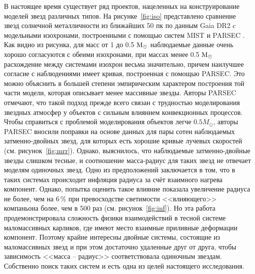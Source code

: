 В настоящее время существует ряд проектов, нацеленных на конструирование моделей звезд различных типов. На рисунке~\ref{fig:iso} представлено сравнение звезд солнечной металличности из ближайших 50 пк по данным Gaia DR2 c модельными изохронами, построенными с помощью систем MIST \cite{2016ApJ...823..102C} и PARSEC \cite{2012MNRAS.427..127B}. Как видно из рисунка, для масс от 1 до 0.5 \(\textup{M}_\odot\) наблюдаемые данные очень хорошо согласуются с обеими изохронами, при массах менее 0.5 \(\textup{M}_\odot\) расхождение между системами изохрон весьма значительно, причем наилучшее согласие с наблюдениями имеет кривая, построенная с помощью PARSEC. Это можно объяснить в большей степени эмпирическим характером построения той части модели, которая описывает менее массивные звезды. Авторы PARSEC отмечают, что такой подход прежде всего связан с трудностью моделирования звездных атмосфер у объектов с сильным влиянием конвекционных процессов. Чтобы справиться с проблемой моделирования объектов легче $0.5 M_\odot$, авторы PARSEC вносили поправки на основе данных для пары сотен наблюдаемых затменно-двойных звезд, для которых есть хорошие кривые лучевых скоростей (см. рисунок~\ref{fig:mrr}). Однако, выяснилось, что наблюдаемые затменно-двойные звезды слишком тесные, и соотношение масса-радиус для таких звезд не отвечает моделям одиночных звезд. Одно из предположений заключается в том, что в таких системах происходит инфляция радиуса за счёт взаимного нагрева компонент. Однако, попытка оценить такое влияние показала увеличение радиуса не более, чем на 6\,\%  при превосходстве светимости <<влияющего>> компаньона более, чем в 500 раз (см. рисунок~\ref{fig:inf}). Но эта работа продемонстрировала сложность физики взаимодействий в тесной системе маломассивных карликов, где имеют место  взаимные приливные деформации компонент. Поэтому крайне интересны двойные системы, состоящие из маломассивных звезд и при этом достаточно удаленные друг от друга, чтобы зависимость <<масса -- радиус>> соответствовала одиночным звездам. Собственно поиск таких систем и есть одна из целей настоящего исследования.

